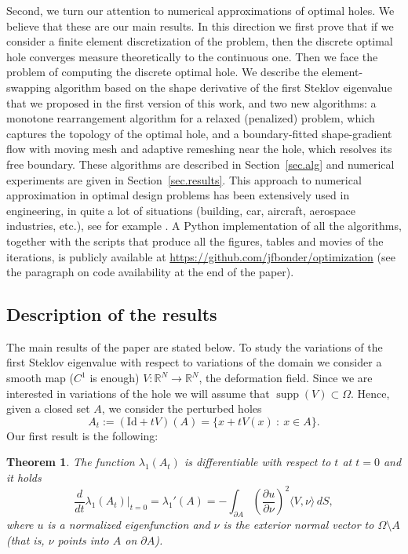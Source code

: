 \documentclass[11pt]{amsart}
\newtheorem{theorem}{Theorem}
\theoremstyle{remark}
\numberwithin{equation}{section}
\newcommand{\R}{\mathbb{R}}
\begin{document}
Second, we turn our attention to numerical approximations of optimal holes. We believe that these are our main results. In this direction we first prove that if we consider a finite element discretization of the problem, then the discrete optimal hole converges measure theoretically to the continuous one. Then we face the problem of computing the discrete optimal hole. We describe the element-swapping algorithm based on the shape derivative of the first Steklov eigenvalue that we proposed in the first version of this work, and two new algorithms: a monotone rearrangement algorithm for a relaxed (penalized) problem, which captures the topology of the optimal hole, and a boundary-fitted shape-gradient flow with moving mesh and adaptive remeshing near the hole, which resolves its free boundary. These algorithms are described in Section~\ref{sec.alg} and numerical experiments are given in Section~\ref{sec.results}. This approach to numerical approximation in optimal design problems has been extensively used in engineering, in quite a lot of situations (building, car, aircraft, aerospace industries, etc.), see for example \cite{Pi}. A Python implementation of all the algorithms, together with the scripts that produce all the figures, tables and movies of the iterations, is publicly available at \url{https://github.com/jfbonder/optimization} (see the paragraph on code availability at the end of the paper).

\subsection{Description of the results}
The main results of the paper are stated below. To study the variations of the first Steklov eigenvalue with respect to variations of the domain we consider a smooth map ($C^1$ is enough) $V:\R^N\to\R^N$, the deformation field. Since we are interested in variations of the hole we will assume that $\operatorname{supp}(V)\subset\Omega$. Hence, given a closed set $A$, we consider the perturbed holes
\[
A_t:=(\mathrm{Id}+tV)(A)=\{x+tV(x)\ :\ x\in A\}.
\]
Our first result is the following:

\begin{theorem}\label{t.deriv}
The function $\lambda_1(A_t)$ is differentiable with respect to $t$ at $t=0$ and it holds
\begin{equation}\label{deriv}
\frac{d}{dt}\lambda_1(A_t)\Big|_{t=0}=\lambda_1'(A)=-\int_{\partial A}\left(\frac{\partial u}{\partial\nu}\right)^2\langle V,\nu\rangle\,dS,
\end{equation}
where $u$ is a normalized eigenfunction and $\nu$ is the exterior normal vector to $\Omega\setminus A$ (that is, $\nu$ points into $A$ on $\partial A$).
\end{theorem}
\end{document}
